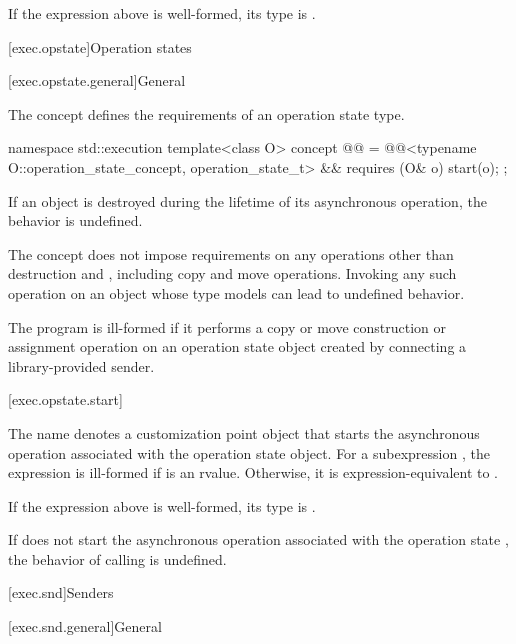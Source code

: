 \mandates
If the expression above is well-formed, its type is .

[exec.opstate]{Operation states}

[exec.opstate.general]{General}

\pnum
The  concept defines
the requirements of an operation state type.
\begin{codeblock}
namespace std::execution {
  template<class O>
    concept @@ =
      @@<typename O::operation_state_concept, operation_state_t> &&
      requires (O& o) {
        start(o);
      };
}
\end{codeblock}

\pnum
If an  object is destroyed
during the lifetime of its asynchronous operation,
the behavior is undefined.
\begin{note}
The  concept does not impose requirements
on any operations other than destruction and ,
including copy and move operations.
Invoking any such operation on an object
whose type models  can lead to undefined behavior.
\end{note}

\pnum
The program is ill-formed
if it performs a copy or move construction or assignment operation on
an operation state object created by connecting a library-provided sender.

[exec.opstate.start]{}

\pnum
The name  denotes a customization point object
that starts
the asynchronous operation associated with the operation state object.
For a subexpression ,
the expression  is ill-formed
if  is an rvalue.
Otherwise, it is expression-equivalent to
.

\mandates
If the expression above is well-formed, its type is .

\pnum
If  does not start
the asynchronous operation associated with the operation state ,
the behavior of calling  is undefined.

[exec.snd]{Senders}

[exec.snd.general]{General}

